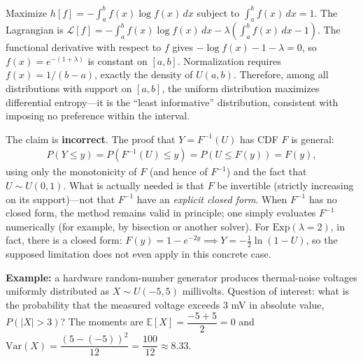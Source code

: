 \begin{solproblema}[prob:5794e09]
	Maximize $h[f] = -\int_a^b f(x)\log f(x)\,dx$ subject to $\int_a^b f(x)\,dx=1$. The Lagrangian is $\mathcal{L}[f] = -\int_a^b f(x)\log f(x)\,dx - \lambda\left(\int_a^b f(x)\,dx - 1\right)$. The functional derivative with respect to $f$ gives $-\log f(x) - 1 - \lambda = 0$, so $f(x) = e^{-(1+\lambda)}$ is constant on $[a,b]$. Normalization requires $f(x) = 1/(b-a)$, exactly the density of $U(a,b)$. Therefore, among all distributions with support on $[a,b]$, the uniform distribution maximizes differential entropy---it is the ``least informative'' distribution, consistent with imposing no preference within the interval.
\end{solproblema}

\begin{solproblema}[prob:126be41]
	The claim is \textbf{incorrect}. The proof that $Y=F^{-1}(U)$ has CDF $F$ is general:
	\begin{align*}
		P(Y\le y) = P(F^{-1}(U)\le y) = P(U\le F(y)) = F(y),
	\end{align*}
	using only the monotonicity of $F$ (and hence of $F^{-1}$) and the fact that $U\sim U(0,1)$. What is actually needed is that $F$ be invertible (strictly increasing on its support)---not that $F^{-1}$ have an \emph{explicit closed form}. When $F^{-1}$ has no closed form, the method remains valid in principle; one simply evaluates $F^{-1}$ numerically (for example, by bisection or another solver). For $\text{Exp}(\lambda=2)$, in fact, there is a closed form: $F(y)=1-e^{-2y} \implies Y = -\tfrac{1}{2}\ln(1-U)$, so the supposed limitation does not even apply in this concrete case.
\end{solproblema}

\begin{solproblema}
	\textbf{Example:} a hardware random-number generator produces thermal-noise voltages uniformly distributed as $X \sim U(-5, 5)$ millivolts. Question of interest: what is the probability that the measured voltage exceeds $3$ mV in absolute value, $P(|X|>3)$? The moments are $\mathbb{E}[X] = \dfrac{-5+5}{2} = 0$ and $\text{Var}(X) = \dfrac{(5-(-5))^2}{12} = \dfrac{100}{12} \approx 8.33$.
\end{solproblema}
